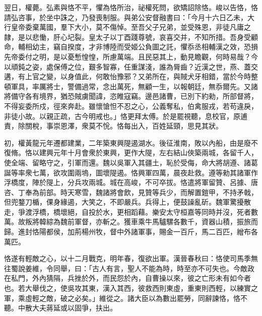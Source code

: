 \begin{pinyinscope}
翌日，權薨。弘素與恪不平，懼為恪所治，祕權死問，欲矯詔除恪。峻以告恪，恪請弘咨事，於坐中誅之，乃發喪制服。與弟公安督融書曰：「今月十六日乙未，大行皇帝委棄萬國，羣下大小，莫不傷悼。至吾父子兄弟，並受殊恩，非徒凡庸之隷，是以悲慟，肝心圮裂。皇太子以丁酉踐尊號，哀喜交并，不知所措。吾身受顧命，輔相幼主，竊自揆度，才非博陸而受姬公負圖之託，懼忝丞相輔漢之效，恐損先帝委付之明，是以憂慙惶惶，所慮萬端。且民惡其上，動見瞻觀，何時易哉？今以頑鈍之姿，處保傅之位，艱多智寡，任重謀淺，誰為脣齒？近漢之世，燕、蓋交遘，有上官之變，以身值此，何敢怡豫邪？又弟所在，與賊犬牙相錯，當於今時整頓軍具，率厲將士，警備過常，念出萬死，無顧一生，以報朝廷，無忝爾先。又諸將備守各有境界，猶恐賊虜聞諱，恣睢寇竊。邊邑諸曹，已別下約勑，所部督將，不得妄委所戍，徑來奔赴。雖懷愴怛不忍之心，公義奪私，伯禽服戎，若苟違戾，非徒小故。以親正疏，古今明戒也。」恪更拜太傅。於是罷視聽，息校官，原逋責，除關稅，事崇恩澤，衆莫不恱。恪每出入，百姓延頸，思見其狀。

初，權黃龍元年遷都建業，二年築東興隄遏湖水。後征淮南，敗以內船，由是廢不復脩。恪以建興元年十月會衆於東興，更作大隄，左右結山俠築兩城，各留千人，使全端、留略守之，引軍而還。魏以吳軍入其疆土，恥於受侮，命大將胡遵、諸葛誕等率衆七萬，欲攻圍兩塢，圖壞隄遏。恪興軍四萬，晨夜赴救。遵等勑其諸軍作浮橋度，陣於隄上，分兵攻兩城。城在高峻，不可卒拔。恪遣將軍留贊、呂據、唐咨、丁奉為前部。時天寒雪，魏諸將會飲，見贊等兵少，而解置鎧甲，不持矛戟，但兜鍪刀楯，倮身緣遏，大笑之，不即嚴兵。兵得上，便鼓譟亂斫。魏軍驚擾散走，爭渡浮橋，橋壞絕，自投於水，更相蹈藉。樂安太守桓嘉等同時并沒，死者數萬。故叛將韓綜為魏前軍督，亦斬之。獲車乘牛馬驢騾各數千，資器山積，振旅而歸。進封恪陽都侯，加荊楊州牧，督中外諸軍事，賜金一百斤，馬二百匹，繒布各萬匹。

恪遂有輕敵之心，以十二月戰克，明年春，復欲出軍。漢晉春秋曰：恪使司馬季無往蜀說姜維，令同舉，曰：「古人有言，聖人不能為時，時至亦不可失也。今敵政在私門，外內猜隔，兵挫於外，而民怨於內，自曹操以來，彼之亡形未有如今者也。若大舉伐之，使吳攻其東，漢入其西，彼救西則東虛，重東則西輕，以練實之軍，乘虛輕之敵，破之必矣。」維從之。諸大臣以為數出罷勞，同辭諫恪，恪不聽。中散大夫蔣延或以固爭，扶出。


\end{pinyinscope}
